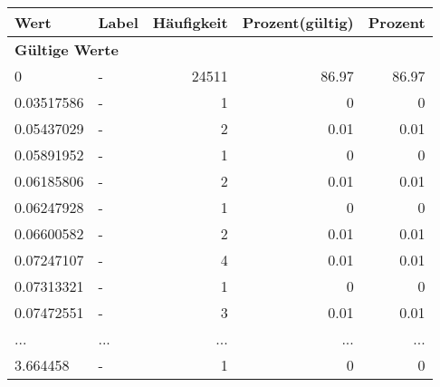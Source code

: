      \begin{longtable}{lXrrr}
     \toprule
     \textbf{Wert} & \textbf{Label} & \textbf{Häufigkeit} & \textbf{Prozent(gültig)} & \textbf{Prozent} \\
     \endhead
     \midrule
     \multicolumn{5}{l}{\textbf{Gültige Werte}}\\
        0 & \multicolumn{1}{X}{-} & %
          \num{24511} &
          \num[round-mode=places,round-precision=2]{86.97} &
          \num[round-mode=places,round-precision=2]{86.97} \\
        0.03517586 & \multicolumn{1}{X}{-} & %
          \num{1} &
          \num[round-mode=places,round-precision=2]{0} &
          \num[round-mode=places,round-precision=2]{0} \\
        0.05437029 & \multicolumn{1}{X}{-} & %
          \num{2} &
          \num[round-mode=places,round-precision=2]{0.01} &
          \num[round-mode=places,round-precision=2]{0.01} \\
        0.05891952 & \multicolumn{1}{X}{-} & %
          \num{1} &
          \num[round-mode=places,round-precision=2]{0} &
          \num[round-mode=places,round-precision=2]{0} \\
        0.06185806 & \multicolumn{1}{X}{-} & %
          \num{2} &
          \num[round-mode=places,round-precision=2]{0.01} &
          \num[round-mode=places,round-precision=2]{0.01} \\
        0.06247928 & \multicolumn{1}{X}{-} & %
          \num{1} &
          \num[round-mode=places,round-precision=2]{0} &
          \num[round-mode=places,round-precision=2]{0} \\
        0.06600582 & \multicolumn{1}{X}{-} & %
          \num{2} &
          \num[round-mode=places,round-precision=2]{0.01} &
          \num[round-mode=places,round-precision=2]{0.01} \\
        0.07247107 & \multicolumn{1}{X}{-} & %
          \num{4} &
          \num[round-mode=places,round-precision=2]{0.01} &
          \num[round-mode=places,round-precision=2]{0.01} \\
        0.07313321 & \multicolumn{1}{X}{-} & %
          \num{1} &
          \num[round-mode=places,round-precision=2]{0} &
          \num[round-mode=places,round-precision=2]{0} \\
        0.07472551 & \multicolumn{1}{X}{-} & %
          \num{3} &
          \num[round-mode=places,round-precision=2]{0.01} &
          \num[round-mode=places,round-precision=2]{0.01} \\
       ... & ... & ... & ... & ... \\
        3.664458 & \multicolumn{1}{X}{-} & %
          \num{1} &
          \num[round-mode=places,round-precision=2]{0} &
          \num[round-mode=places,round-precision=2]{0} \\


\end{longtable}
